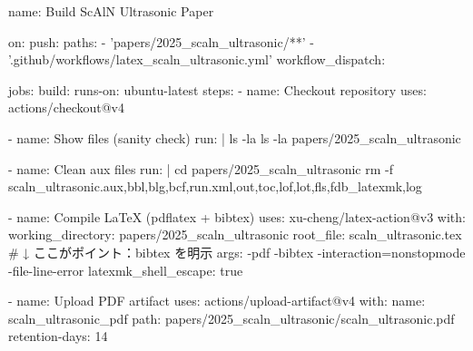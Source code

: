 name: Build ScAlN Ultrasonic Paper

on:
  push:
    paths:
      - 'papers/2025_scaln_ultrasonic/**'
      - '.github/workflows/latex_scaln_ultrasonic.yml'
  workflow_dispatch: {}

jobs:
  build:
    runs-on: ubuntu-latest
    steps:
      - name: Checkout repository
        uses: actions/checkout@v4

      - name: Show files (sanity check)
        run: |
          ls -la
          ls -la papers/2025_scaln_ultrasonic

      - name: Clean aux files
        run: |
          cd papers/2025_scaln_ultrasonic
          rm -f scaln_ultrasonic.{aux,bbl,blg,bcf,run.xml,out,toc,lof,lot,fls,fdb_latexmk,log}

      - name: Compile LaTeX (pdflatex + bibtex)
        uses: xu-cheng/latex-action@v3
        with:
          working_directory: papers/2025_scaln_ultrasonic
          root_file: scaln_ultrasonic.tex
          # ↓ ここがポイント：bibtex を明示
          args: -pdf -bibtex -interaction=nonstopmode -file-line-error
          latexmk_shell_escape: true

      - name: Upload PDF artifact
        uses: actions/upload-artifact@v4
        with:
          name: scaln_ultrasonic_pdf
          path: papers/2025_scaln_ultrasonic/scaln_ultrasonic.pdf
          retention-days: 14
